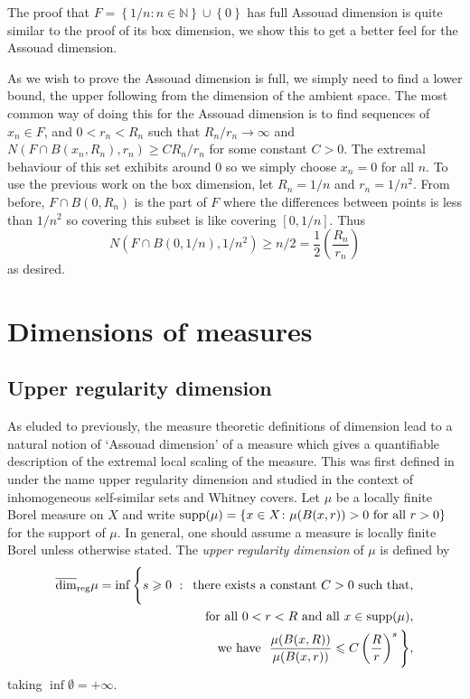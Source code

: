 The proof that $F=\left\{1/n \colon n \in \mathbb{N} \right\} \cup \left\{0 \right\}$ has full Assouad dimension is quite similar to the proof of its box dimension, we show this to get a better feel for the Assouad dimension.

As we wish to prove the Assouad dimension is full, we simply need to find a lower bound, the upper following from the dimension of the ambient space. The most common way of doing this for the Assouad dimension is to find sequences of $x_n \in F$, and $0<r_n < R_n$ such that $R_n/r_n \rightarrow \infty$ and $N(F \cap B(x_n, R_n), r_n ) \ge CR_n/r_n$ for some constant $C>0$. The extremal behaviour of this set exhibits around 0 so we simply choose $x_n = 0$ for all $n$. To use the previous work on the box dimension, let $R_n = 1/n$ and $r_n = 1/n^2$. From before, $F\cap B(0,R_n)$ is the part of $F$ where the differences between points is less than $1/n^2$ so covering this subset is like covering $[0,1/n]$. Thus
\[
N(F \cap B(0, 1/n), 1/n^2 ) \ge n/2 = \frac{1}{2} \left( \frac{R_n}{r_n}\right)
\]
as desired.





\section{Dimensions of measures}
\label{sec:intro-measures}

\subsection{Upper regularity dimension}
\label{sec:intro-upper-reg}

As eluded to previously, the measure theoretic definitions of dimension lead to a natural notion of `Assouad dimension' of a measure which gives a quantifiable description of the extremal local scaling of the measure. This was first defined in \cite{anti1,anti2} under the name upper regularity dimension and studied in the context of inhomogeneous self-similar sets and Whitney covers. Let $\mu$ be a locally finite Borel measure on $X$ and write $\text{supp}(\mu) = \left\{ x \in X \colon \mu(B(x,r)) > 0 \textup{ for all } r > 0 \right\}$ for the support of $\mu$. In general, one should assume a measure is locally finite Borel unless otherwise stated. The \textit{upper regularity dimension} of $\mu$ is defined by 
\begin{align*} 
\overline{\dim}_{\textup{reg}} \mu = \inf \Bigg\{ s \geqslant 0 \, \,  : \,  \text{ there exists a  constant }C  > 0\text{  such that,} \\ \text{for all } 0< r< R  \text{  and all }x \in \text{supp} (\mu), \\ \text{we have }  \  \frac{\mu(B(x,R))}{\mu(B(x,r))} \leqslant C\left(\frac{R}{r}\right)^{s} \Bigg\},
\end{align*}
taking $\inf \emptyset = + \infty$. 

